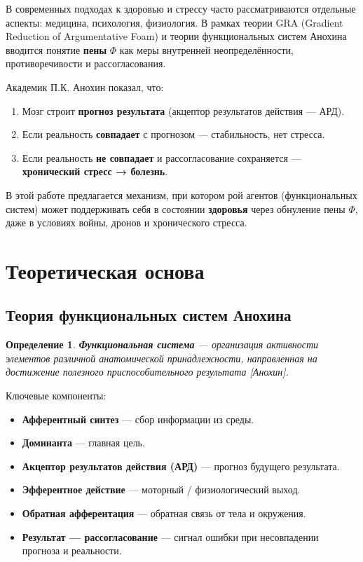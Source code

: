 \documentclass[11pt,a4paper]{article}
\newtheorem{definition}{Определение}
\begin{document}
В современных подходах к здоровью и стрессу часто рассматриваются отдельные аспекты: медицина, психология, физиология.
В рамках теории GRA (Gradient Reduction of Argumentative Foam) и теории функциональных систем Анохина вводится понятие \textbf{пены} $\Phi$ как меры внутренней неопределённости, противоречивости и рассогласования.

Академик П.К. Анохин показал, что:
\begin{enumerate}
  \item Мозг строит \textbf{прогноз результата} (акцептор результатов действия — АРД).
  \item Если реальность \textbf{совпадает} с прогнозом — стабильность, нет стресса.
  \item Если реальность \textbf{не совпадает} и рассогласование сохраняется — \textbf{хронический стресс → болезнь}.
\end{enumerate}

В этой работе предлагается механизм, при котором рой агентов (функциональных систем) может поддерживать себя в состоянии \textbf{здоровья} через обнуление пены $\Phi$, даже в условиях войны, дронов и хронического стресса.

\section{Теоретическая основа}

\subsection{Теория функциональных систем Анохина}

\begin{definition}
\textbf{Функциональная система} — организация активности элементов различной анатомической принадлежности, направленная на достижение полезного приспособительного результата [Анохин].
\end{definition}

Ключевые компоненты:
\begin{itemize}
  \item \textbf{Афферентный синтез} — сбор информации из среды.
  \item \textbf{Доминанта} — главная цель.
  \item \textbf{Акцептор результатов действия (АРД)} — прогноз будущего результата.
  \item \textbf{Эфферентное действие} — моторный / физиологический выход.
  \item \textbf{Обратная афферентация} — обратная связь от тела и окружения.
  \item \textbf{Результат — рассогласование} — сигнал ошибки при несовпадении прогноза и реальности.
\end{itemize}
\end{document}
